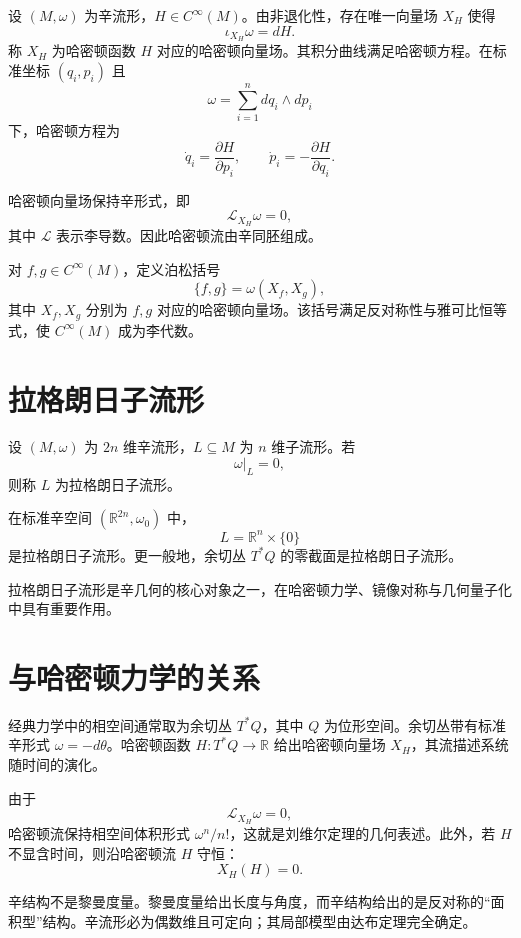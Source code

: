 设 \((M,\omega)\) 为辛流形，\(H\in C^\infty(M)\)。由非退化性，存在唯一向量场 \(X_H\) 使得
\[
\iota_{X_H}\omega=dH.
\]
称 \(X_H\) 为哈密顿函数 \(H\) 对应的哈密顿向量场。其积分曲线满足哈密顿方程。在标准坐标 \((q_i,p_i)\) 且
\[
\omega=\sum_{i=1}^n dq_i\wedge dp_i
\]
下，哈密顿方程为
\[
\dot q_i=\frac{\partial H}{\partial p_i},
\qquad
\dot p_i=-\frac{\partial H}{\partial q_i}.
\]

哈密顿向量场保持辛形式，即
\[
\mathcal L_{X_H}\omega=0,
\]
其中 \(\mathcal L\) 表示李导数。因此哈密顿流由辛同胚组成。

\begin{definition}[泊松括号]
对 \(f,g\in C^\infty(M)\)，定义泊松括号
\[
\{f,g\}=\omega(X_f,X_g),
\]
其中 \(X_f,X_g\) 分别为 \(f,g\) 对应的哈密顿向量场。该括号满足反对称性与雅可比恒等式，使 \(C^\infty(M)\) 成为李代数。
\end{definition}

\section{拉格朗日子流形}

\begin{definition}[拉格朗日子流形]
设 \((M,\omega)\) 为 \(2n\) 维辛流形，\(L\subseteq M\) 为 \(n\) 维子流形。若
\[
\omega|_L=0,
\]
则称 \(L\) 为拉格朗日子流形。
\end{definition}

\begin{example}
在标准辛空间 \((\mathbb R^{2n},\omega_0)\) 中，
\[
L=\mathbb R^n\times\{0\}
\]
是拉格朗日子流形。更一般地，余切丛 \(T^*Q\) 的零截面是拉格朗日子流形。
\end{example}

拉格朗日子流形是辛几何的核心对象之一，在哈密顿力学、镜像对称与几何量子化中具有重要作用。

\section{与哈密顿力学的关系}

经典力学中的相空间通常取为余切丛 \(T^*Q\)，其中 \(Q\) 为位形空间。余切丛带有标准辛形式 \(\omega=-d\theta\)。哈密顿函数 \(H:T^*Q\to\mathbb R\) 给出哈密顿向量场 \(X_H\)，其流描述系统随时间的演化。

由于
\[
\mathcal L_{X_H}\omega=0,
\]
哈密顿流保持相空间体积形式 \(\omega^n/n!\)，这就是刘维尔定理的几何表述。此外，若 \(H\) 不显含时间，则沿哈密顿流 \(H\) 守恒：
\[
X_H(H)=0.
\]

\begin{remark}
辛结构不是黎曼度量。黎曼度量给出长度与角度，而辛结构给出的是反对称的“面积型”结构。辛流形必为偶数维且可定向；其局部模型由达布定理完全确定。
\end{remark}
